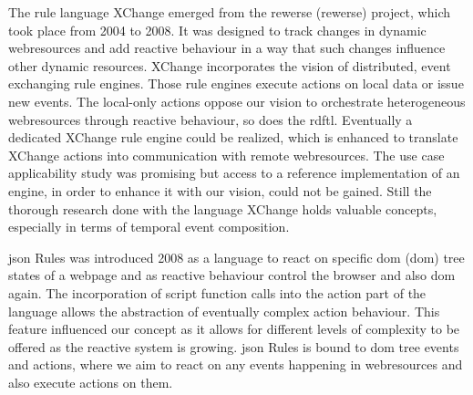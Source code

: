 The rule language \textrm{XChange}\cite{2005-Patranjan-TLE.pdf} emerged from the \textrm{\acrlong{rewerse} (\acrshort{rewerse})} project\cite{wwwRewerse}, which took place from 2004 to 2008. 
It was designed to track changes in dynamic \glspl{webresource} and add reactive behaviour in a way that such changes influence other dynamic resources.
\textrm{XChange} incorporates the vision of distributed, event exchanging rule engines.
Those rule engines execute actions on local data or issue new events.
The local-only actions oppose our vision to orchestrate heterogeneous \glspl{webresource} through reactive behaviour, so does the \textrm{\acrshort{rdftl}}.
Eventually a dedicated \textrm{XChange} rule engine could be realized, which is enhanced to translate \textrm{XChange} actions into communication with remote \glspl{webresource}.
The use case applicability study was promising but access to a reference implementation of an engine, in order to enhance it with our vision, could not be gained. %
Still the thorough research done with the language \textrm{XChange} holds valuable concepts, especially in terms of temporal event composition.

\textrm{\acrshort{json} Rules}\cite{2008-Giurca_Pascalau-JSON_Rules.pdf} was introduced 2008 as a language to react on specific \textrm{\acrlong{dom} (\acrshort{dom})} tree states of a webpage and as reactive behaviour control the browser and also \textrm{\acrshort{dom}} again.
The incorporation of script function calls into the action part of the language allows the abstraction of eventually complex action behaviour.
This feature influenced our concept as it allows for different levels of complexity to be offered as the reactive system is growing.
\textrm{\acrshort{json} Rules} is bound to \textrm{\acrshort{dom}} tree events and actions, where we aim to react on any events happening in \glspl{webresource} and also execute actions on them.

